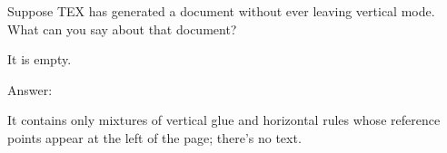 Suppose TEX has generated a document without ever leaving vertical mode.
What can you say about that document?

It is empty.

Answer:

It contains only mixtures of vertical glue and horizontal rules whose reference
points appear at the left of the page; there’s no text.

\bye
